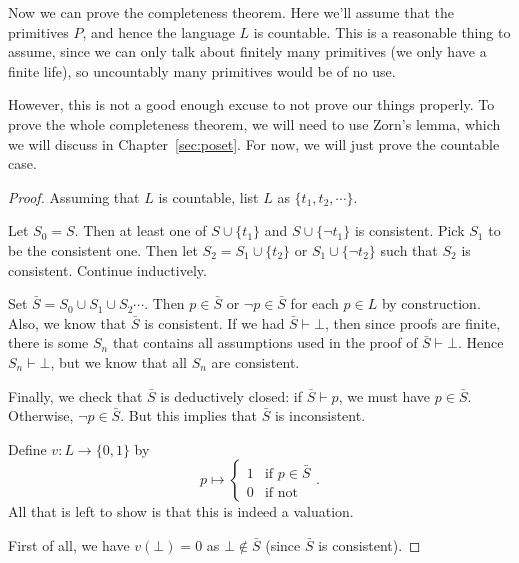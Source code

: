 \documentclass[a4paper]{article}
\begin{document}
Now we can prove the completeness theorem. Here we'll assume that the primitives $P$, and hence the language $L$ is countable. This is a reasonable thing to assume, since we can only talk about finitely many primitives (we only have a finite life), so uncountably many primitives would be of no use.

However, this is not a good enough excuse to not prove our things properly. To prove the whole completeness theorem, we will need to use Zorn's lemma, which we will discuss in Chapter~\ref{sec:poset}. For now, we will just prove the countable case.

\begin{proof}
  Assuming that $L$ is countable, list $L$ as $\{t_1, t_2, \cdots\}$.

  Let $S_0 = S$. Then at least one of $S\cup \{t_1\}$ and $S\cup \{\neg t_1\}$ is consistent. Pick $S_1$ to be the consistent one. Then let $S_2 = S_1 \cup \{t_2\}$ or $S_1\cup \{\neg t_2\}$ such that $S_2$ is consistent. Continue inductively.

  Set $\bar{S} = S_0\cup S_1\cup S_2\cdots$. Then $p\in \bar{S}$ or $\neg p\in \bar{S}$ for each $p\in L$ by construction. Also, we know that $\bar S$ is consistent. If we had $\bar S\vdash \bot$, then since proofs are finite, there is some $S_n$ that contains all assumptions used in the proof of $\bar S \vdash \bot$. Hence $S_n \vdash \bot$, but we know that all $S_n$ are consistent.

  Finally, we check that $\bar S$ is deductively closed: if $\bar S\vdash p$, we must have $p \in \bar S$. Otherwise, $\neg p\in \bar S$. But this implies that $\bar S$ is inconsistent.

  Define $v: L\to \{0, 1\}$ by
  \[
    p \mapsto
    \begin{cases}
      1 & \text{if }p\in \bar S\\
      0 & \text{if not}
    \end{cases}.
  \]
  All that is left to show is that this is indeed a valuation.

  First of all, we have $v(\bot) = 0$ as $\bot \not\in \bar S$ (since $\bar S$ is consistent).


\end{proof}
\end{document}
